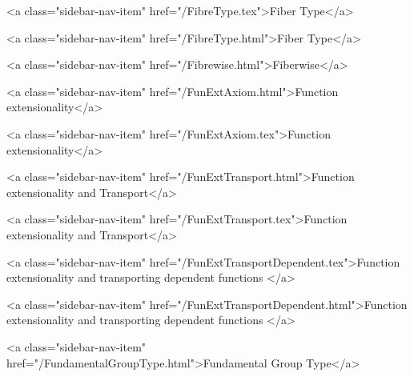       
    
      
        
          <a class="sidebar-nav-item" href="/FibreType.tex">Fiber Type</a>
        
      
    
      
        
          <a class="sidebar-nav-item" href="/FibreType.html">Fiber Type</a>
        
      
    
      
        
          <a class="sidebar-nav-item" href="/Fibrewise.html">Fiberwise</a>
        
      
    
      
        
          <a class="sidebar-nav-item" href="/FunExtAxiom.html">Function extensionality</a>
        
      
    
      
        
          <a class="sidebar-nav-item" href="/FunExtAxiom.tex">Function extensionality</a>
        
      
    
      
        
          <a class="sidebar-nav-item" href="/FunExtTransport.html">Function extensionality and Transport</a>
        
      
    
      
        
          <a class="sidebar-nav-item" href="/FunExtTransport.tex">Function extensionality and Transport</a>
        
      
    
      
        
          <a class="sidebar-nav-item" href="/FunExtTransportDependent.tex">Function extensionality and transporting dependent functions </a>
        
      
    
      
        
          <a class="sidebar-nav-item" href="/FunExtTransportDependent.html">Function extensionality and transporting dependent functions </a>
        
      
    
      
        
          <a class="sidebar-nav-item" href="/FundamentalGroupType.html">Fundamental Group Type</a>
        
      
    
